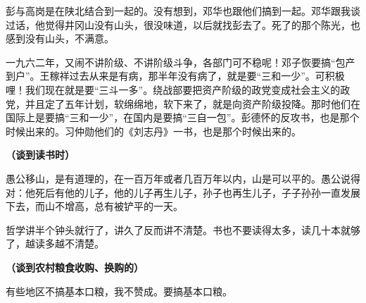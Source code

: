 彭与高岗是在陕北结合到一起的。没有想到，邓华也跟他们搞到一起。邓华跟我谈过话，他觉得井冈山没有山头，很没味道，以后就找彭去了。死了的那个陈光，也感到没有山头，不满意。

一九六二年，又闹不讲阶级、不讲阶级斗争，各部门可不稳呢！邓子恢要搞“包产到户”。王稼祥过去从来是有病，那半年没有病了，就是要“三和一少”。可积极哩！我们现在就是要“三斗一多”。绕战部要把资产阶级的政党变成社会主义的政党，并且定了五年计划，软绵绵地，软下来了，就是向资产阶级投降。那时他们在国际上是要搞“三和一少”，在国内是要搞“三自一包”。彭德怀的反攻书，也是那个时候出来的。习仲勋他们的《刘志丹》一书，也是那个时候出来的。

\textbf{（谈到读书时）}

愚公移山，是有道理的，在一百万年或者几百万年以内，山是可以平的。愚公说得对：他死后有他的儿子，他的儿子再生儿子，孙子也再生儿子，子子孙孙一直发展下去，而山不增高，总有被铲平的一天。

哲学讲半个钟头就行了，讲久了反而讲不清楚。书也不要读得太多，读几十本就够了，越读多越不清楚。

\textbf{（谈到农村粮食收购、换购的）}

有些地区不搞基本口粮，我不赞成。要搞基本口粮。
